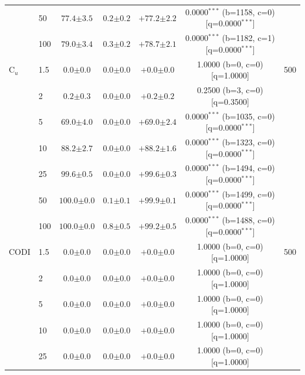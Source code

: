 \begin{table}[h!]
\begin{tabular}{l l cccc c}
 & 50 & $77.4 {\scriptstyle \pm 3.5}$ & $0.2 {\scriptstyle \pm 0.2}$ & $+77.2 {\scriptstyle \pm 2.2}$ & 0.0000$^{***}$ (b=1158, c=0) [q=0.0000$^{***}$] &  \\
 & 100 & $79.0 {\scriptstyle \pm 3.4}$ & $0.3 {\scriptstyle \pm 0.2}$ & $+78.7 {\scriptstyle \pm 2.1}$ & 0.0000$^{***}$ (b=1182, c=1) [q=0.0000$^{***}$] &  \\
\midrule
C$_u$ & 1.5 & $0.0 {\scriptstyle \pm 0.0}$ & $0.0 {\scriptstyle \pm 0.0}$ & $+0.0 {\scriptstyle \pm 0.0}$ & 1.0000 (b=0, c=0) [q=1.0000] & 500 \\
 & 2 & $0.2 {\scriptstyle \pm 0.3}$ & $0.0 {\scriptstyle \pm 0.0}$ & $+0.2 {\scriptstyle \pm 0.2}$ & 0.2500 (b=3, c=0) [q=0.3500] &  \\
 & 5 & $69.0 {\scriptstyle \pm 4.0}$ & $0.0 {\scriptstyle \pm 0.0}$ & $+69.0 {\scriptstyle \pm 2.4}$ & 0.0000$^{***}$ (b=1035, c=0) [q=0.0000$^{***}$] &  \\
 & 10 & $88.2 {\scriptstyle \pm 2.7}$ & $0.0 {\scriptstyle \pm 0.0}$ & $+88.2 {\scriptstyle \pm 1.6}$ & 0.0000$^{***}$ (b=1323, c=0) [q=0.0000$^{***}$] &  \\
 & 25 & $99.6 {\scriptstyle \pm 0.5}$ & $0.0 {\scriptstyle \pm 0.0}$ & $+99.6 {\scriptstyle \pm 0.3}$ & 0.0000$^{***}$ (b=1494, c=0) [q=0.0000$^{***}$] &  \\
 & 50 & $100.0 {\scriptstyle \pm 0.0}$ & $0.1 {\scriptstyle \pm 0.1}$ & $+99.9 {\scriptstyle \pm 0.1}$ & 0.0000$^{***}$ (b=1499, c=0) [q=0.0000$^{***}$] &  \\
 & 100 & $100.0 {\scriptstyle \pm 0.0}$ & $0.8 {\scriptstyle \pm 0.5}$ & $+99.2 {\scriptstyle \pm 0.5}$ & 0.0000$^{***}$ (b=1488, c=0) [q=0.0000$^{***}$] &  \\
\midrule
CODI & 1.5 & $0.0 {\scriptstyle \pm 0.0}$ & $0.0 {\scriptstyle \pm 0.0}$ & $+0.0 {\scriptstyle \pm 0.0}$ & 1.0000 (b=0, c=0) [q=1.0000] & 500 \\
 & 2 & $0.0 {\scriptstyle \pm 0.0}$ & $0.0 {\scriptstyle \pm 0.0}$ & $+0.0 {\scriptstyle \pm 0.0}$ & 1.0000 (b=0, c=0) [q=1.0000] &  \\
 & 5 & $0.0 {\scriptstyle \pm 0.0}$ & $0.0 {\scriptstyle \pm 0.0}$ & $+0.0 {\scriptstyle \pm 0.0}$ & 1.0000 (b=0, c=0) [q=1.0000] &  \\
 & 10 & $0.0 {\scriptstyle \pm 0.0}$ & $0.0 {\scriptstyle \pm 0.0}$ & $+0.0 {\scriptstyle \pm 0.0}$ & 1.0000 (b=0, c=0) [q=1.0000] &  \\
 & 25 & $0.0 {\scriptstyle \pm 0.0}$ & $0.0 {\scriptstyle \pm 0.0}$ & $+0.0 {\scriptstyle \pm 0.0}$ & 1.0000 (b=0, c=0) [q=1.0000] &  \\

\end{tabular}
\end{table}
